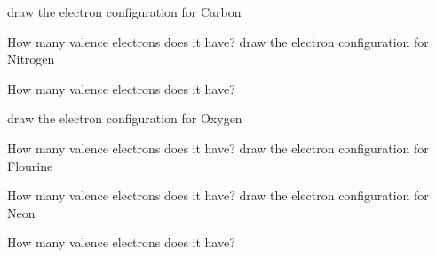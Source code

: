 \documentclass[12pt]{exam}
\begin{document}
\begin{questions}
\question draw the electron configuration for Carbon  



How many valence electrons does it have? \fillin[1][1cm]
\question draw the electron configuration for Nitrogen  


How many valence electrons does it have? \fillin[1][1cm]

\vspace{2cm}
\question draw the electron configuration for Oxygen  


How many valence electrons does it have? \fillin[1][1cm]
\question draw the electron configuration for Flourine  


How many valence electrons does it have? \fillin[1][1cm]
\question draw the electron configuration for Neon  


How many valence electrons does it have? \fillin[1][1cm]
\end{questions}
\end{document}

